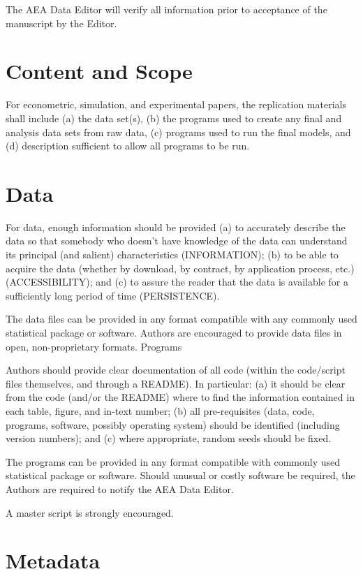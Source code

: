 \documentclass[PP]{AEA}
\begin{document}
The AEA Data Editor will verify all information prior to acceptance of the manuscript by the Editor.

\section{Content and Scope}

For econometric, simulation, and experimental papers, the replication materials shall include (a) the data set(s), (b) the programs used to create any final and analysis data sets from raw data, (c) programs used to run the final models, and (d) description sufficient to allow all programs to be run.

\section{Data}

For data, enough information should be provided (a) to accurately describe the data so that somebody who doesn’t have knowledge of the data can understand its principal (and salient)  characteristics (INFORMATION); (b) to be able to acquire the data (whether by download, by contract, by application process, etc.) (ACCESSIBILITY); and (c) to assure the reader that the data is available for a sufficiently long period of time (PERSISTENCE). 

The data files can be provided in any format compatible with any commonly used statistical package or software. Authors are encouraged to provide data files in open, non-proprietary formats.
Programs

Authors should provide clear documentation of all code (within the code/script files themselves, and through a README). In particular: (a) it should be clear from the code (and/or the README) where to find the information contained in each table, figure, and in-text number; (b) all pre-requisites (data, code, programs, software, possibly operating system) should be identified (including version numbers); and (c) where appropriate, random seeds should be fixed.

The programs can be provided in any format compatible with commonly used statistical package or software. Should unusual or costly software be required, the Authors are required to notify the AEA Data Editor.

A master script is strongly encouraged.

\section{Metadata}
\end{document}
